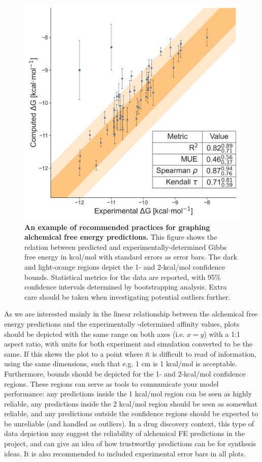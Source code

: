 \documentclass[9pt,bestpractices]{livecoms}
\begin{document}
\begin{figure}
  \includegraphics[width=0.95\linewidth]{paper/figures/fig13_analysis_practices/Figure.png}
  \caption{\textbf{An example of recommended practices for graphing alchemical free energy predictions.} This figure shows the relation between predicted and experimentally-determined Gibbs free energy in kcal/mol with standard errors as error bars. The dark and light-orange regions depict the 1- and 2-kcal/mol confidence bounds. Statistical metrics for the data are reported, with 95\% confidence intervals determined by bootstrapping analysis. Extra care should be taken when investigating potential outliers further.}
   \label{fig:scatterplot_analysis}
\end{figure}

As we are interested mainly in the linear relationship between the alchemical free energy predictions and the experimentally -determined affinity values, plots should be depicted with the same range on both axes (i.e. $x=y$) with a 1:1 aspect ratio, with units for both experiment and simulation converted to be the same. If this skews the plot to a point where it is difficult to read of information, using the same dimensions, such that e.g. 1 cm is 1 kcal/mol is acceptable. Furthermore, bounds should be depicted for the 1- and 2-kcal/mol confidence regions. These regions can serve as tools to communicate your model performance: any predictions inside the 1 kcal/mol region can be seen as highly reliable, any predictions inside the 2 kcal/mol region should be seen as somewhat reliable, and any predictions outside the confidence regions should be expected to be unreliable (and handled as outliers). In a drug discovery context, this type of data depiction may suggest the reliability of alchemical FE predictions in the project, and can give an idea of how trustworthy predictions can be for synthesis ideas. It is also recommended to included experimental error bars in all plots.
\end{document}
